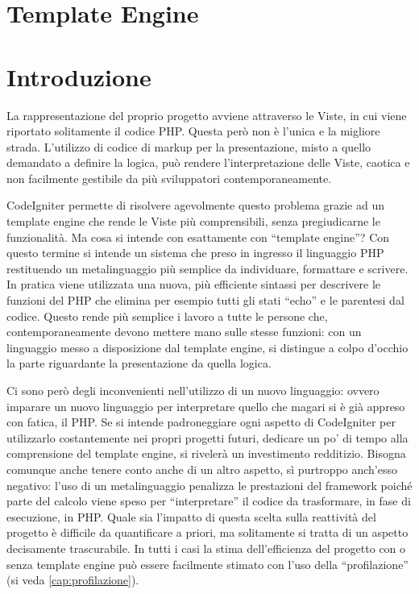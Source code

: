 \section{Template Engine}
\label{cap:template}

\section*{Introduzione}
La rappresentazione del proprio progetto avviene attraverso le Viste, in cui viene riportato solitamente il codice \ac{PHP}. Questa però non è l'unica e la migliore strada. L'utilizzo di codice di markup per la presentazione, misto a quello demandato a definire la logica, può rendere l'interpretazione delle Viste, caotica e non facilmente gestibile da più sviluppatori contemporaneamente.

CodeIgniter permette di risolvere agevolmente questo problema grazie ad un template engine che rende le Viste più comprensibili, senza pregiudicarne le funzionalità. Ma cosa si intende con esattamente con ``template engine''? Con questo termine si intende un sistema che preso in ingresso il linguaggio \ac{PHP} restituendo un metalinguaggio più semplice da individuare, formattare e scrivere. In pratica viene utilizzata una nuova, più efficiente sintassi per descrivere le funzioni del \ac{PHP} che elimina per esempio tutti gli stati ``echo'' e le parentesi dal codice. Questo rende più semplice i lavoro a tutte le persone che, contemporaneamente devono mettere mano sulle stesse funzioni: con un linguaggio messo a disposizione dal template engine, si distingue a colpo d'occhio la parte riguardante la presentazione da quella logica.

Ci sono però degli inconvenienti nell'utilizzo di un nuovo linguaggio: ovvero imparare un nuovo linguaggio per interpretare quello che magari si è già appreso con fatica, il \ac{PHP}. Se si intende padroneggiare ogni aspetto di CodeIgniter per utilizzarlo costantemente nei propri progetti futuri, dedicare un po' di tempo alla comprensione del template engine, si rivelerà un investimento redditizio. Bisogna comunque anche tenere conto anche di un altro aspetto, sì purtroppo anch'esso negativo: l'uso di un metalinguaggio penalizza le prestazioni del framework poiché parte del calcolo viene speso per ``interpretare'' il codice da trasformare, in fase di esecuzione, in \ac{PHP}. Quale sia l'impatto di questa scelta sulla reattività del progetto è difficile da quantificare a priori, ma solitamente si tratta di un aspetto decisamente trascurabile. In tutti i casi la stima dell'efficienza del progetto con o senza template engine può essere facilmente stimato con l'uso della ``profilazione'' (si veda \vref{cap:profilazione}).

